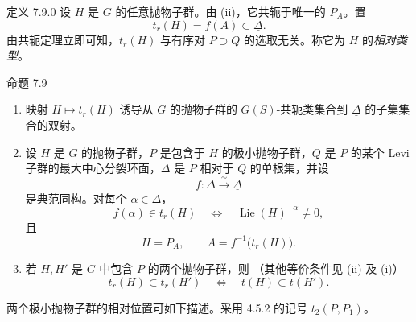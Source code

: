 \begin{sgastatement}{定义 7.9.0}
设 \(H\) 是 \(G\) 的任意抛物子群。由 \textup{(ii)}，它共轭于唯一的 \(P_A\)。置
\[
 t_r(H)=f(A)\subset\underline\Delta.
\]
由共轭定理立即可知，\(t_r(H)\) 与有序对 \(P\supset Q\) 的选取无关。称它为 \(H\) 的\emph{相对类型}。
\end{sgastatement}

\begin{sgastatement}{命题 7.9}
\begin{enumerate}[label=\textup{(\roman*)}]
\item 映射 \(H\mapsto t_r(H)\) 诱导从 \(G\) 的抛物子群的 \(G(S)\)-共轭类集合到 \(\underline\Delta\) 的子集集合的双射。
\item 设 \(H\) 是 \(G\) 的抛物子群，\(P\) 是包含于 \(H\) 的极小抛物子群，\(Q\) 是 \(P\) 的某个 Levi 子群的最大中心分裂环面，\(\Delta\) 是 \(P\) 相对于 \(Q\) 的单根集，并设
\[
 f:\Delta\xrightarrow{\ \sim\ }\underline\Delta
\]
是典范同构。对每个 \(\alpha\in\Delta\)，
\[
 f(\alpha)\in t_r(H)
 \quad\Longleftrightarrow\quad
 \operatorname{Lie}(H)^{-\alpha}\ne0,
\]
且
\[
 H=P_A,\qquad A=f^{-1}\bigl(t_r(H)\bigr).
\]
\item 若 \(H,H'\) 是 \(G\) 中包含 \(P\) 的两个抛物子群，则 \textup{（其他等价条件见 \textup{(ii)} 及 \textup{(i)}）}
\[
 t_r(H)\subset t_r(H')
 \quad\Longleftrightarrow\quad
 t(H)\subset t(H').
\]
\end{enumerate}
\end{sgastatement}



两个极小抛物子群的相对位置可如下描述。采用 4.5.2 的记号 \(t_2(P,P_1)\)。

